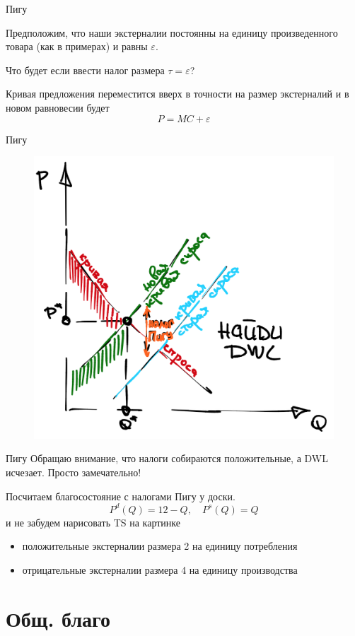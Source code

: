 \documentclass{beamer}
\begin{document}
\begin{frame}{Пигу}

Предположим, что наши экстерналии постоянны на единицу произведенного товара (как в примерах) и равны $\varepsilon$.

Что будет если ввести налог размера $\tau = \varepsilon$?

Кривая предложения переместится вверх в точности на размер экстерналий и в новом равновесии будет 
$$ P = MC + \varepsilon$$
\end{frame}

\begin{frame}{Пигу}
\begin{figure}[hbt]
\centering
\includegraphics[width=.8 \textwidth]{dwl2.png}
\end{figure}
\end{frame}

\begin{frame}{Пигу}
Обращаю внимание, что налоги собираются положительные, а DWL исчезает. Просто замечательно!

Посчитаем благосостояние с налогами Пигу у доски.
$$ P^d(Q) = 12 - Q, \quad P^s(Q) = Q$$
и не забудем нарисовать TS на картинке
\begin{itemize}
  \item положительные экстерналии размера 2 на единицу потребления
  \item отрицательные экстерналии размера 4 на единицу производства
\end{itemize}
\end{frame}

\section{Общ. благо}
\end{document}
